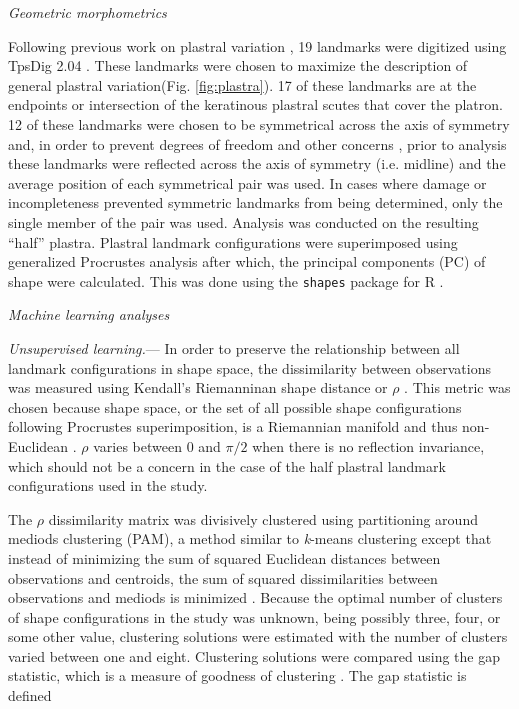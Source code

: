 \documentclass[12pt,letterpaper]{article}
\renewcommand{\subsection}[1]{%
\bigskip
\begin{center}
\begin{large}
\normalfont\itshape #1
\end{large}
\end{center}}
\renewcommand{\subsubsection}[1]{%
\vspace{2ex}
\noindent
\textit{#1.}---}
\begin{document}
\subsection{Geometric morphometrics}
Following previous work on plastral variation \citep{Angielczyk2007,Angielczyk2011,Angielczyk2013a}, 19 landmarks were digitized using TpsDig 2.04 \citep{Rohlf2005}. These landmarks were chosen to maximize the description of general plastral variation(Fig. \ref{fig:plastra}). 17 of these landmarks are at the endpoints or intersection of the keratinous plastral scutes that cover the platron. 12 of these landmarks were chosen to be symmetrical across the axis of symmetry and, in order to prevent degrees of freedom and other concerns \citep{Klingenberg2002}, prior to analysis these landmarks were reflected across the axis of symmetry (i.e. midline) and the average position of each symmetrical pair was used. In cases where damage or incompleteness prevented symmetric landmarks from being determined, only the single member of the pair was used. Analysis was conducted on the resulting ``half'' plastra. Plastral landmark configurations were superimposed using generalized Procrustes analysis \citep{Dryden1998a} after which, the principal components (PC) of shape were calculated. This was done using the \texttt{shapes} package for R \citep{2013,Dryden2013}.


\subsection{Machine learning analyses}
\subsubsection{Unsupervised learning}
In order to preserve the relationship between all landmark configurations in shape space, the dissimilarity between observations was measured using Kendall's Riemanninan shape distance or \(\rho\) \citep{Kendall1984a,Dryden1998a}. This metric was chosen because shape space, or the set of all possible shape configurations following Procrustes superimposition, is a Riemannian manifold and thus non-Euclidean \citep{Dryden1998a}. \(\rho\) varies between 0 and \(\pi / 2\) when there is no reflection invariance, which should not be a concern in the case of the half plastral landmark configurations used in the study.

The \(\rho\) dissimilarity matrix was divisively clustered using partitioning around mediods clustering (PAM), a method similar to \textit{k}-means clustering except that instead of minimizing the sum of squared Euclidean distances between observations and centroids, the sum of squared dissimilarities between observations and mediods is minimized \citep{Kaufman1990}. Because the optimal number of clusters of shape configurations in the study was unknown, being possibly three, four, or some other value, clustering solutions were estimated with the number of clusters varied between one and eight. Clustering solutions were compared using the gap statistic, which is a measure of goodness of clustering \citep{Tibshirani2001a}. The gap statistic is defined
\end{document}
